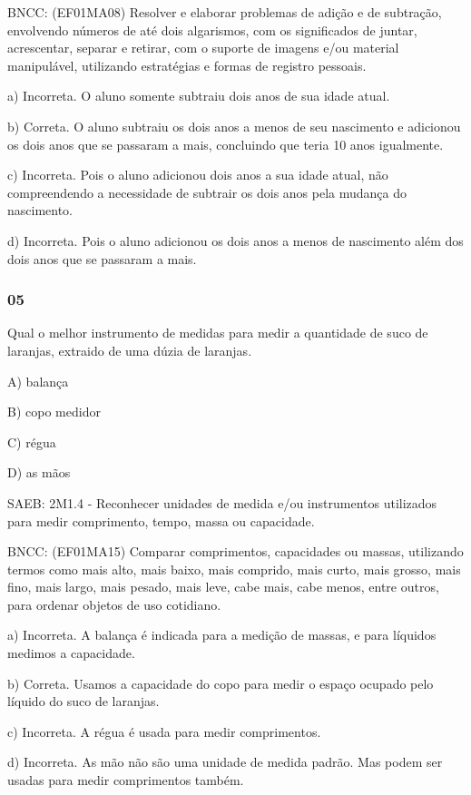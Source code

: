 BNCC: (EF01MA08) Resolver e elaborar problemas de adição e de subtração,
envolvendo números de até dois algarismos, com os significados de
juntar, acrescentar, separar e retirar, com o suporte de imagens e/ou
material manipulável, utilizando estratégias e formas de registro
pessoais.

a) Incorreta. O aluno somente subtraiu dois anos de sua idade atual.

b) Correta. O aluno subtraiu os dois anos a menos de seu nascimento e
adicionou os dois anos que se passaram a mais, concluindo que teria 10
anos igualmente.

c) Incorreta. Pois o aluno adicionou dois anos a sua idade atual, não
compreendendo a necessidade de subtrair os dois anos pela mudança do
nascimento.

d) Incorreta. Pois o aluno adicionou os dois anos a menos de nascimento
além dos dois anos que se passaram a mais.

\subsubsection{05}\label{section-136}

Qual o melhor instrumento de medidas para medir a quantidade de suco de
laranjas, extraido de uma dúzia de laranjas.

A) balança

B) copo medidor

C) régua

D) as mãos

SAEB: 2M1.4 - Reconhecer unidades de medida e/ou instrumentos utilizados
para medir comprimento, tempo, massa ou capacidade.

BNCC: (EF01MA15) Comparar comprimentos, capacidades ou massas,
utilizando termos como mais alto, mais baixo, mais comprido, mais curto,
mais grosso, mais fino, mais largo, mais pesado, mais leve, cabe mais,
cabe menos, entre outros, para ordenar objetos de uso cotidiano.

a) Incorreta. A balança é indicada para a medição de massas, e para
líquidos medimos a capacidade.

b) Correta. Usamos a capacidade do copo para medir o espaço ocupado pelo
líquido do suco de laranjas.

c) Incorreta. A régua é usada para medir comprimentos.

d) Incorreta. As mão não são uma unidade de medida padrão. Mas podem ser
usadas para medir comprimentos também.

